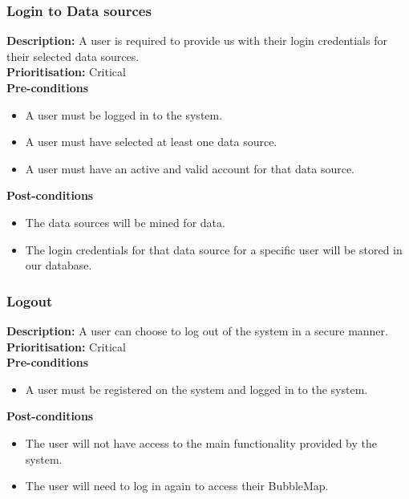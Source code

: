 \documentclass[hidelinks,english]{article}
\begin{document}
    		\subsubsection{Login to Data sources}
				\textbf{Description:}  A user is required to provide us with their login credentials for their selected data sources.\\
    			\textbf{Prioritisation:} Critical\\
      			\textbf{Pre-conditions}
    			\begin{itemize}
        			\item A user must be logged in to the system.
        			\item A user must have selected at least one data source.
        			\item A user must have an active and valid account for that data source.
    			\end{itemize}
    			\textbf{Post-conditions}
     			\begin{itemize}
        			\item The data sources will be mined for data.
        			\item The login credentials for that data source for a specific user will be stored in our database.
    			\end{itemize}
    		\subsubsection{Logout}
				\textbf{Description:}  A user can choose to log out of the system in a secure manner.\\
    			\textbf{Prioritisation:} Critical\\
      			\textbf{Pre-conditions}
    			\begin{itemize}
        			\item A user must be registered on the system and logged in to the system.
    			\end{itemize}
    			\textbf{Post-conditions}
     			\begin{itemize}
        			\item The user will not have access to the main functionality provided by the system.
        			\item The user will need to log in again to access their BubbleMap.
    			\end{itemize}
\end{document}
